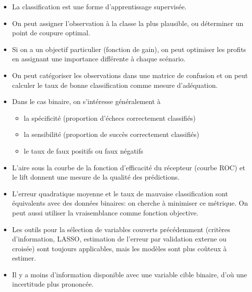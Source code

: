 \documentclass[
  11pt,
  letterpaper,
]{scrbook}
\providecommand{\tightlist}{%
  \setlength{\itemsep}{0pt}\setlength{\parskip}{0pt}}\usepackage{longtable,booktabs,array}
\theoremstyle{definition}
\theoremstyle{remark}
\begin{document}
\begin{tcolorbox}[enhanced jigsaw, title=\textcolor{quarto-callout-note-color}{\faInfo}\hspace{0.5em}{En résumé}, toptitle=1mm, bottomrule=.15mm, leftrule=.75mm, left=2mm, opacityback=0, colbacktitle=quarto-callout-note-color!10!white, coltitle=black, toprule=.15mm, colframe=quarto-callout-note-color-frame, breakable, bottomtitle=1mm, titlerule=0mm, arc=.35mm, colback=white, rightrule=.15mm, opacitybacktitle=0.6]

\begin{itemize}
\tightlist
\item
  La classification est une forme d'apprentissage supervisée.
\item
  On peut assigner l'observation à la classe la plus plausible, ou
  déterminer un point de coupure optimal.
\item
  Si on a un objectif particulier (fonction de gain), on peut optimiser
  les profits en assignant une importance différente à chaque scénario.
\item
  On peut catégoriser les observations dans une matrice de confusion et
  on peut calculer le taux de bonne classification comme mesure
  d'adéquation.
\item
  Dans le cas binaire, on s'intéresse généralement à

  \begin{itemize}
  \tightlist
  \item
    la spécificité (proportion d'échecs correctement classifiés)
  \item
    la sensibilité (proportion de succès correctement classifiés)
  \item
    le taux de faux positifs ou faux négatifs
  \end{itemize}
\item
  L'aire sous la courbe de la fonction d'efficacité du récepteur (courbe
  ROC) et le lift donnent une mesure de la qualité des prédictions.
\item
  L'erreur quadratique moyenne et le taux de mauvaise classification
  sont équivalents avec des données binaires: on cherche à minimiser ce
  métrique. On peut aussi utiliser la vraisemblance comme fonction
  objective.
\item
  Les outils pour la sélection de variables couverts précédemment
  (critères d'information, LASSO, estimation de l'erreur par validation
  externe ou croisée) sont toujours applicables, mais les modèles sont
  plus coûteux à estimer.
\item
  Il y a moins d'information disponible avec une variable cible binaire,
  d'où une incertitude plus prononcée.
\end{itemize}

\end{tcolorbox}
\end{document}
